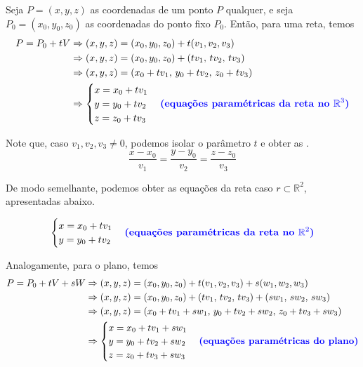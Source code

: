 \documentclass[../main.tex]{subfiles}
\begin{document}
			Seja $P=(x,y,z)$ as coordenadas de um ponto $P$ qualquer, e seja $P_0=(x_0, y_0, z_0)$ as coordenadas do ponto fixo $P_0$. Então, para uma reta, temos
			\begin{align*}
				P=P_0+tV
				&\Rightarrow (x,y,z)=(x_0,y_0,z_0)+t(v_1,v_2,v_3)\\
				&\Rightarrow (x,y,z)=(x_0,y_0,z_0)+(tv_1,\, tv_2,\, tv_3)\\
				&\Rightarrow (x,y,z)=(x_0+tv_1,\, y_0+tv_2,\, z_0+tv_3)\\
				&\Rightarrow \begin{cases}
					x=x_0+tv_1\\
					y=y_0+tv_2\\
					z=z_0+tv_3
				\end{cases} \text{\textbf{\textcolor{blue}{(equações paramétricas da reta no 	$\mathbb{R}^3$)}}}
			\end{align*}
			
			Note que, caso $v_1,v_2,v_3\neq 0$, podemos isolar o parâmetro $t$ e obter as .
			\[
			\frac{x-x_0}{v_1}=\frac{y-y_0}{v_2}=\frac{z-z_0}{v_3}
			\]
			
			De modo semelhante, podemos obter as equações da reta caso $r\subset \mathbb{R}^2$, apresentadas abaixo.
			
			\[
			\begin{cases}
				x=x_0+tv_1\\
				y=y_0+tv_2
			\end{cases} \text{\textbf{\textcolor{blue}{(equações paramétricas da reta no 	$\mathbb{R}^2$)}}}
			\]
			
			Analogamente, para o plano, temos
			\begin{align*}
				P=P_0+tV+sW
				&\Rightarrow 	(x,y,z)=(x_0,y_0,z_0)+t(v_1,v_2,v_3)+s(w_1,w_2,w_3)\\
				&\Rightarrow (x,y,z)=(x_0,y_0,z_0)+(tv_1,\, tv_2,\, 		tv_3)+(sw_1,\, sw_2,\, sw_3)\\
				&\Rightarrow (x,y,z)=(x_0+tv_1+sw_1,\, y_0+tv_2+sw_2,\, 	z_0+tv_3+sw_3)\\
				&\Rightarrow \begin{cases}
					x=x_0+tv_1+sw_1\\
					y=y_0+tv_2+sw_2\\
					z=z_0+tv_3+sw_3
				\end{cases} \text{\textbf{\textcolor{blue}{(equações paramétricas do plano)}}}
			\end{align*}
			
\end{document}

